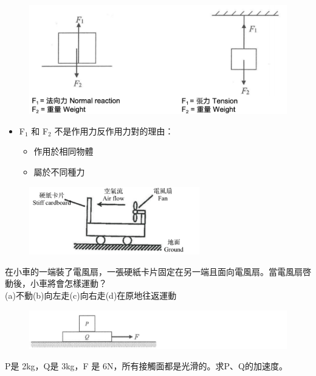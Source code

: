 \documentclass[beamer=true]{standalone}
\begin{document}
\begin{frame}{}
    \begin{figure}[h!]
        \centering
        \includegraphics[width=.8\textwidth]{assets/6a71f82b.png}
    \end{figure}
    \begin{itemize}
        \item F$_1$ 和 F$_2$ 不是作用力反作用力對的理由：
              \begin{itemize}
                  \item 作用於相同物體
                  \item 屬於不同種力
              \end{itemize}
    \end{itemize}
\end{frame}



\begin{eg}
    \begin{figure}[h!]
        \centering
        \includegraphics[width=0.66\textwidth]{assets/323c58f6.png}
    \end{figure}
    在小車的一端裝了電風扇，一張硬紙卡片固定在另一端且面向電風扇。當電風扇啓動後，小車將會怎樣運動？\\(a)不動(b)向左走(c)向右走(d)在原地往返運動


\end{eg}

\begin{eg}
    \begin{figure}[h!]
        \centering
        \includegraphics[width=.8\textwidth]{assets/9c913c73.png}
    \end{figure}
    P是 2kg，Q是 3kg，F 是 6N，所有接觸面都是光滑的。求P、Q的加速度。
\end{eg}
\end{document}
